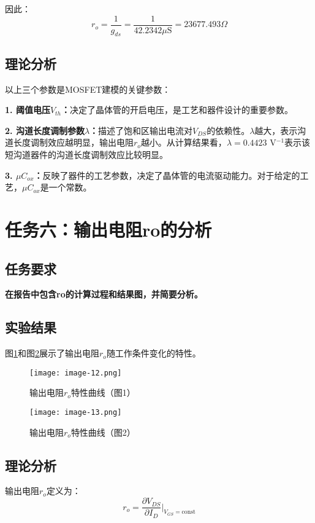 \documentclass[UTF8,12pt,a4paper]{ctexart}
\begin{document}
因此：
\begin{equation}
r_o = \frac{1}{g_{ds}} = \frac{1}{42.2342\mu\text{S}} = 23677.493\Omega
\end{equation}

\subsection{理论分析}
以上三个参数是MOSFET建模的关键参数：

\textbf{1. 阈值电压$V_{th}$：}决定了晶体管的开启电压，是工艺和器件设计的重要参数。

\textbf{2. 沟道长度调制参数$\lambda$：}描述了饱和区输出电流对$V_{DS}$的依赖性。$\lambda$越大，表示沟道长度调制效应越明显，输出电阻$r_o$越小。从计算结果看，$\lambda = 0.4423$ V$^{-1}$表示该短沟道器件的沟道长度调制效应比较明显。

\textbf{3. $\mu C_{ox}$：}反映了器件的工艺参数，决定了晶体管的电流驱动能力。对于给定的工艺，$\mu C_{ox}$是一个常数。

\newpage
\section{任务六：输出电阻ro的分析}

\subsection{任务要求}
\textbf{在报告中包含ro的计算过程和结果图，并简要分析。}

\subsection{实验结果}
图\ref{fig:task6a}和图\ref{fig:task6b}展示了输出电阻$r_o$随工作条件变化的特性。

\begin{figure}[h]
\centering
\texttt{[image: image-12.png]}
\caption{输出电阻$r_o$特性曲线（图1）}
\label{fig:task6a}
\end{figure}

\begin{figure}[h]
\centering
\texttt{[image: image-13.png]}
\caption{输出电阻$r_o$特性曲线（图2）}
\label{fig:task6b}
\end{figure}

\subsection{理论分析}
输出电阻$r_o$定义为：
\begin{equation}
r_o = \frac{\partial V_{DS}}{\partial I_D}\bigg|_{V_{GS}=\text{const}}
\end{equation}
\end{document}
